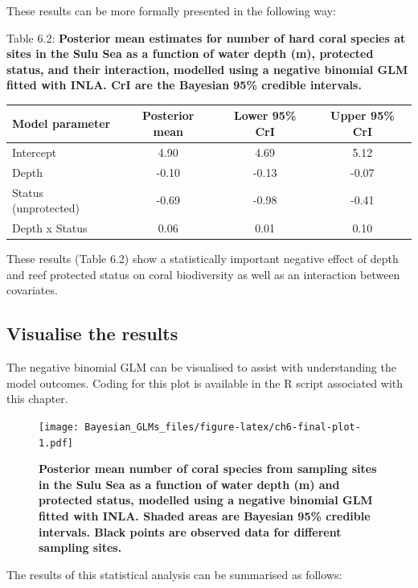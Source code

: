 \documentclass[
]{book}
\begin{document}
These results can be more formally presented in the following way:

Table 6.2: \textbf{Posterior mean estimates for number of hard coral species at sites in the Sulu Sea as a function of water depth (m), protected status, and their interaction, modelled using a negative binomial GLM fitted with INLA. CrI are the Bayesian 95\% credible intervals.}

\begin{longtable}[]{@{}lccc@{}}
\toprule
Model parameter & Posterior mean & Lower 95\% CrI & Upper 95\% CrI \\
\midrule
\endhead
Intercept & 4.90 & 4.69 & 5.12 \\
Depth & -0.10 & -0.13 & -0.07 \\
Status (unprotected) & -0.69 & -0.98 & -0.41 \\
Depth x Status & 0.06 & 0.01 & 0.10 \\
\bottomrule
\end{longtable}

These results (Table 6.2) show a statistically important negative effect of depth and reef protected status on coral biodiversity as well as an interaction between covariates.

\hypertarget{visualise-the-results-2}{%
\subsection{Visualise the results}\label{visualise-the-results-2}}

The negative binomial GLM can be visualised to assist with understanding the model outcomes. Coding for this plot is available in the R script associated with this chapter.



\begin{figure}
\centering
\texttt{[image: Bayesian\_GLMs\_files/figure-latex/ch6-final-plot-1.pdf]}
\caption{\label{fig:ch6-final-plot}\textbf{Posterior mean number of coral species from sampling sites in the Sulu Sea as a function of water depth (m) and protected status, modelled using a negative binomial GLM fitted with INLA. Shaded areas are Bayesian 95\% credible intervals. Black points are observed data for different sampling sites.}}
\end{figure}

The results of this statistical analysis can be summarised as follows:
\end{document}
